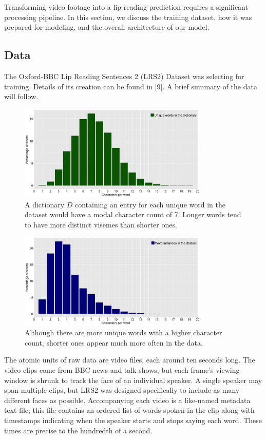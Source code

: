 \documentclass{article}
\begin{document}
Transforming video footage into a lip-reading prediction requires a significant processing pipeline. In this section, we discuss the training dataset, how it was prepared for modeling, and the overall architecture of our model.

\subsection{Data}

The Oxford-BBC Lip Reading Sentences 2 (LRS2) Dataset was selecting for training. Details of its creation can be found in [9]. A brief summary of the data will follow.

  \begin{figure}[h!]
 \centering
  \includegraphics[width=0.8\textwidth]{uniqueWords}
 \caption{A dictionary $D$ containing an entry for each unique word in the dataset would have a modal character count of 7. Longer words tend to have more distinct visemes than shorter ones.}
 \end{figure}
 
   \begin{figure}[h!]
 \centering
  \includegraphics[width=0.8\textwidth]{wordInstances}
 \caption{Although there are more unique words with a higher character count, shorter ones appear much more often in the data.}
 \end{figure}

The atomic units of raw data are video files, each around ten seconds long. The video clips come from BBC news and talk shows, but each frame's viewing window is shrunk to track the face of an individual speaker. A single speaker may span multiple clips, but LRS2 was designed specifically to include as many different faces as possible. Accompanying each video is a like-named metadata text file; this file contains an ordered list of words spoken in the clip along with timestamps indicating when the speaker starts and stops saying each word. These times are precise to the hundredth of a second.
\end{document}
